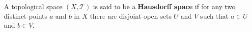 A topological space $(X, \mathcal{T})$ is said to be a \textbf{Hausdorff space} if for any two distinct points $a$ and $b$ in $X$ there are disjoint open sets $U$ and $V$ such that $a \in U$ and $b \in V$.
